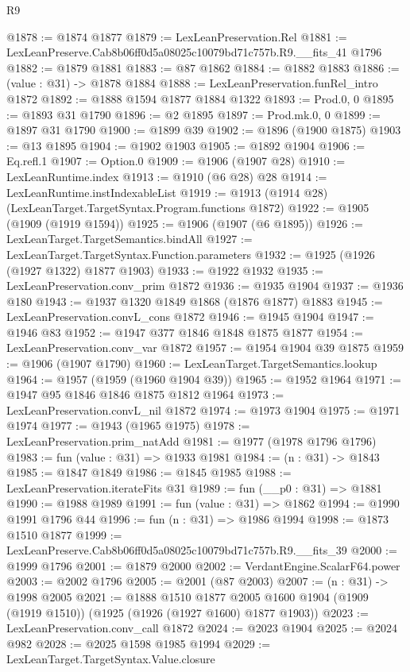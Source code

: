 \begin{lexlean}{R9}
\begin{coremodule}
@1878 := @1874 @1877
@1879 := LexLeanPreservation.Rel
@1881 := LexLeanPreserve.Cab8b06ff0d5a08025c10079bd71c757b.R9.__fits_41 @1796
@1882 := @1879 @1881
@1883 := @87 @1862
@1884 := @1882 @1883
@1886 := (value : @31) -> @1878 @1884
@1888 := LexLeanPreservation.funRel_intro @1872
@1892 := @1888 @1594 @1877 @1884 @1322
@1893 := Prod.{0, 0}
@1895 := @1893 @31 @1790
@1896 := @2 @1895
@1897 := Prod.mk.{0, 0}
@1899 := @1897 @31 @1790
@1900 := @1899 @39
@1902 := @1896 (@1900 @1875)
@1903 := @13 @1895
@1904 := @1902 @1903
@1905 := @1892 @1904
@1906 := Eq.refl.{1}
@1907 := Option.{0}
@1909 := @1906 (@1907 @28)
@1910 := LexLeanRuntime.index
@1913 := @1910 (@6 @28) @28
@1914 := LexLeanRuntime.instIndexableList
@1919 := @1913 (@1914 @28) (LexLeanTarget.TargetSyntax.Program.functions @1872)
@1922 := @1905 (@1909 (@1919 @1594))
@1925 := @1906 (@1907 (@6 @1895))
@1926 := LexLeanTarget.TargetSemantics.bindAll
@1927 := LexLeanTarget.TargetSyntax.Function.parameters
@1932 := @1925 (@1926 (@1927 @1322) @1877 @1903)
@1933 := @1922 @1932
@1935 := LexLeanPreservation.conv_prim @1872
@1936 := @1935 @1904
@1937 := @1936 @180
@1943 := @1937 @1320 @1849 @1868 (@1876 @1877) @1883
@1945 := LexLeanPreservation.convL_cons @1872
@1946 := @1945 @1904
@1947 := @1946 @83
@1952 := @1947 @377 @1846 @1848 @1875 @1877
@1954 := LexLeanPreservation.conv_var @1872
@1957 := @1954 @1904 @39 @1875
@1959 := @1906 (@1907 @1790)
@1960 := LexLeanTarget.TargetSemantics.lookup
@1964 := @1957 (@1959 (@1960 @1904 @39))
@1965 := @1952 @1964
@1971 := @1947 @95 @1846 @1846 @1875 @1812 @1964
@1973 := LexLeanPreservation.convL_nil @1872
@1974 := @1973 @1904
@1975 := @1971 @1974
@1977 := @1943 (@1965 @1975)
@1978 := LexLeanPreservation.prim_natAdd
@1981 := @1977 (@1978 @1796 @1796)
@1983 := fun (value : @31) => @1933 @1981
@1984 := (n : @31) -> @1843
@1985 := @1847 @1849
@1986 := @1845 @1985
@1988 := LexLeanPreservation.iterateFits @31
@1989 := fun (__p0 : @31) => @1881
@1990 := @1988 @1989
@1991 := fun (value : @31) => @1862
@1994 := @1990 @1991 @1796 @44
@1996 := fun (n : @31) => @1986 @1994
@1998 := @1873 @1510 @1877
@1999 := LexLeanPreserve.Cab8b06ff0d5a08025c10079bd71c757b.R9.__fits_39
@2000 := @1999 @1796
@2001 := @1879 @2000
@2002 := VerdantEngine.ScalarF64.power
@2003 := @2002 @1796
@2005 := @2001 (@87 @2003)
@2007 := (n : @31) -> @1998 @2005
@2021 := @1888
    @1510
    @1877
    @2005
    @1600
    @1904
    (@1909 (@1919 @1510))
    (@1925 (@1926 (@1927 @1600) @1877 @1903))
@2023 := LexLeanPreservation.conv_call @1872
@2024 := @2023 @1904
@2025 := @2024 @982
@2028 := @2025 @1598 @1985 @1994
@2029 := LexLeanTarget.TargetSyntax.Value.closure

\end{coremodule}
\end{lexlean}
